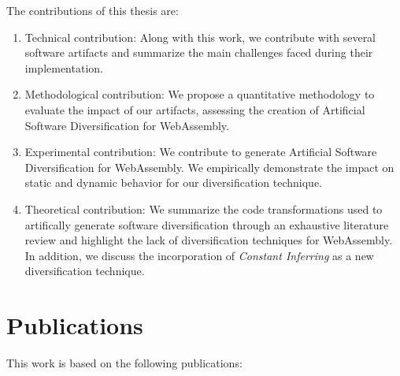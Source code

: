 The contributions of this thesis are:

\begin{enumerate}[label=\subscript{C}{{\arabic*}}]
    \item Technical contribution: Along with this work, we contribute with several software artifacts and summarize the main challenges faced during their implementation.
    
    \item Methodological contribution: We propose a quantitative methodology to evaluate the impact of our artifacts, assessing the creation of Artificial Software Diversification for WebAssembly.  
    
    \item Experimental contribution: We contribute to generate Artificial Software Diversification for WebAssembly. We empirically demonstrate the impact on static and dynamic behavior for our diversification technique.
    
    \item Theoretical contribution: We summarize the code transformations used to artifically generate software diversification through an exhaustive literature review and highlight the lack of diversification techniques for WebAssembly. In addition, we discuss the incorporation of \emph{Constant Inferring} as a new diversification technique.
\end{enumerate}

\section{Publications}

This work is based on the following publications:


